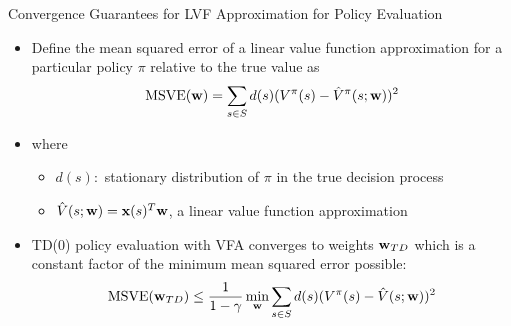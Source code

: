 \documentclass[aspectratio=169]{../latex_main/tntbeamer}  %
\begin{document}
\begin{frame}[c]{Convergence Guarantees for LVF
		Approximation for Policy Evaluation}
	
\begin{itemize}
	\item Define the mean squared error of a linear value function
	approximation for a particular policy $\pi$ relative to the true value as
	$$\text{MSVE}(\mathbf{w}) = \sum_{s\in S} d(s) (V^\pi(s) - \hat{V}^\pi (s;\mathbf{w}))^2$$
	\item where
	\begin{itemize}
		\item $d(s):$ stationary distribution of $\pi$ in the true decision process
		\item $\hat{V}(s;\mathbf{w}) = \mathbf{x}(s)^T \mathbf{w}$, a linear value function approximation
	\end{itemize}
	\item TD(0) policy evaluation with VFA converges to weights $\mathbf{w}_{TD}$ which is a constant factor of the minimum mean squared error possible:
	$$\text{MSVE}(\mathbf{w}_{TD}) \leq \frac{1}{1-\gamma} \min_{\mathbf{w}}\sum_{s\in S} d(s) (V^\pi(s) - \hat{V}(s;\mathbf{w}))^2$$
\end{itemize}

	
\end{frame}
\end{document}
